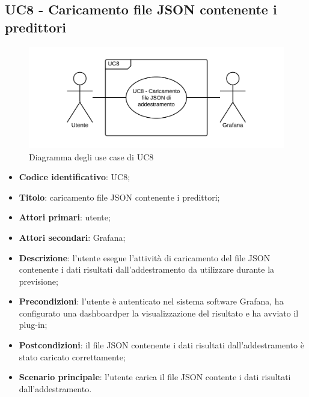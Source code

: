 \subsection{UC8 - Caricamento file JSON contenente i predittori}
\begin{figure}[H]
\includegraphics{img/UC8_-_Caricamento_file_JSON_di_addestramento.png}
\caption{Diagramma degli use case di UC8}
\end{figure}
\begin{itemize}
	\item \textbf{Codice identificativo}: UC8;
	\item \textbf{Titolo}: caricamento file JSON contenente i predittori;
	\item \textbf{Attori primari}: utente;
	\item \textbf{Attori secondari}: Grafana\glo;
	\item \textbf{Descrizione}: l'utente esegue l'attività di caricamento del file JSON contenente i dati risultati dall'addestramento da utilizzare durante la previsione;
	\item \textbf{Precondizioni}: l'utente è autenticato nel sistema software Grafana\glosp, ha configurato una dashboard\glosp per la visualizzazione del risultato e ha avviato il plug-in;
	\item \textbf{Postcondizioni}: il file JSON contenente i dati risultati dall'addestramento è stato caricato correttamente;
	\item \textbf{Scenario principale}: l'utente carica il file JSON contente i dati risultati dall'addestramento.
\end{itemize}
